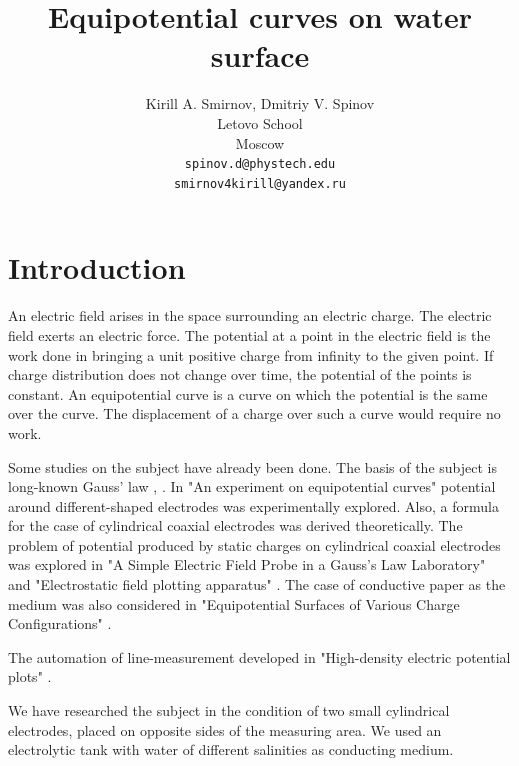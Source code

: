 \documentclass{article}
\title{Equipotential curves on water surface}
\author{
  Kirill A. Smirnov, Dmitriy V. Spinov \\
  Letovo School \\
  Moscow\\
  \texttt{spinov.d@phystech.edu} \\
  \texttt{smirnov4kirill@yandex.ru} \\
}
\begin{document}
\maketitle


\begin{abstract}
	
\end{abstract}


\section{Introduction}            %
An electric field arises in the space surrounding an electric charge. The electric field exerts an electric force. The potential at a point in the electric field is the work done in bringing a unit positive charge from infinity to the given point. If charge distribution does not change over time, the potential of the points is constant. An equipotential curve is a curve on which the potential is the same over the curve. The displacement of a charge over such a curve would require no work.\par

Some studies on the subject have already been done. The basis of the subject is long-known Gauss' law \cite{gauss}, \cite{landavshic}. In "An experiment on equipotential curves"\cite{khaparde} potential around different-shaped electrodes was experimentally explored. Also, a formula for the case of cylindrical coaxial electrodes was derived theoretically. The problem of potential produced by static charges on cylindrical coaxial electrodes was explored in "A Simple Electric Field Probe in a Gauss's Law Laboratory"\cite{ludwigsen} and "Electrostatic field plotting apparatus" \cite{smith}. The case of conductive paper as the medium was also considered in "Equipotential Surfaces of Various Charge Configurations" \cite{beyond}.

The automation of line-measurement developed in "High-density electric potential plots" \cite{binder2015high}.

We have researched the subject in the condition of two small cylindrical electrodes, placed on opposite sides of the measuring area. We used an electrolytic tank with water of different salinities as conducting medium.


\end{document}
